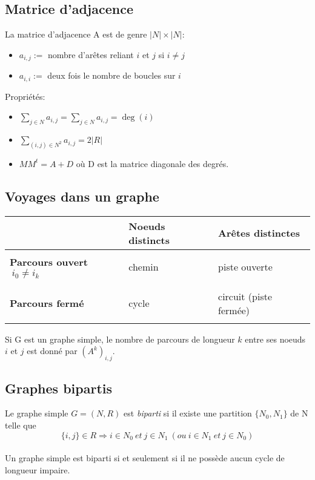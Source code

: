 \subsection{Matrice d'adjacence}
La matrice d'adjacence A est de genre $|N| \times |N|$:\\
\begin{itemize}
\item $a_{i,j} :=$ nombre d'arêtes reliant $i$ et $j$ si $i \neq j$\\
\item $a_{i,i} :=$ deux fois le nombre de boucles sur $i$\\
\end{itemize}
Propriétés:\\
\begin{itemize}
\item $\sum_{j \in N}a_{i,j} = \sum_{j \in N}a_{i,j} = \deg(i)$\\
\item $\sum_{(i,j) \in N^2}a_{i,j} = 2|R|$\\
\item $MM^t = A + D$ où D est la matrice diagonale des degrés.\\
\end{itemize}
\subsection{Voyages dans un graphe}
\begin{center}
\begin{tabular}{p{4cm}|p{3.5cm}|p{3.5cm}}
&\textbf{Noeuds distincts}&\textbf{Arêtes distinctes}\\
\hline
&&\\
\textbf{Parcours ouvert $\: i_0 \neq i_k$}&chemin&piste ouverte\\
&&\\
\hline
&&\\
\textbf{Parcours fermé}&cycle&circuit (piste fermée)\\
&&\\
\end{tabular}
\end{center}
Si G est un graphe simple, le nombre de parcours de longueur $k$ entre ses noeuds $i$ et $j$ est donné par $(A^k)_{i,j}$.
\subsection{Graphes bipartis}
Le graphe simple $G = (N, R)$ est \emph{biparti} si il existe une partition $\{N_0, N_1\}$ de N telle que 
\[\{i, j\} \in R \Rightarrow i \in N_0\: et \: j \in N_1\:(ou\:i \in N_1\: et \: j \in N_0)\]\\
Un graphe simple est biparti si et seulement si il ne possède aucun cycle de longueur impaire.
